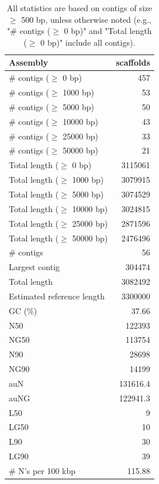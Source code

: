 \documentclass[12pt,a4paper]{article}
\begin{document}
\begin{table}[ht]
\begin{center}
\caption{All statistics are based on contigs of size $\geq$ 500 bp, unless otherwise noted (e.g., "\# contigs ($\geq$ 0 bp)" and "Total length ($\geq$ 0 bp)" include all contigs).}
\begin{tabular}{|l*{1}{|r}|}
\hline
Assembly & scaffolds \\ \hline
\# contigs ($\geq$ 0 bp) & 457 \\ \hline
\# contigs ($\geq$ 1000 bp) & 53 \\ \hline
\# contigs ($\geq$ 5000 bp) & 50 \\ \hline
\# contigs ($\geq$ 10000 bp) & 43 \\ \hline
\# contigs ($\geq$ 25000 bp) & 33 \\ \hline
\# contigs ($\geq$ 50000 bp) & 21 \\ \hline
Total length ($\geq$ 0 bp) & 3115061 \\ \hline
Total length ($\geq$ 1000 bp) & 3079915 \\ \hline
Total length ($\geq$ 5000 bp) & 3074529 \\ \hline
Total length ($\geq$ 10000 bp) & 3024815 \\ \hline
Total length ($\geq$ 25000 bp) & 2871596 \\ \hline
Total length ($\geq$ 50000 bp) & 2476496 \\ \hline
\# contigs & 56 \\ \hline
Largest contig & 304474 \\ \hline
Total length & 3082492 \\ \hline
Estimated reference length & 3300000 \\ \hline
GC (\%) & 37.66 \\ \hline
N50 & 122393 \\ \hline
NG50 & 113754 \\ \hline
N90 & 28698 \\ \hline
NG90 & 14199 \\ \hline
auN & 131616.4 \\ \hline
auNG & 122941.3 \\ \hline
L50 & 9 \\ \hline
LG50 & 10 \\ \hline
L90 & 30 \\ \hline
LG90 & 39 \\ \hline
\# N's per 100 kbp & 115.88 \\ \hline
\end{tabular}
\end{center}
\end{table}
\end{document}

